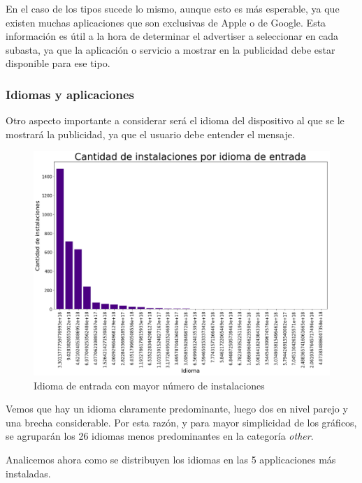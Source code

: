 \documentclass[a4paper, 12pt]{article}
\begin{document}
		En el caso de los tipos sucede lo mismo, aunque esto es más esperable, ya que existen muchas aplicaciones que son exclusivas de Apple o de Google. Esta información es útil a la hora de determinar el advertiser a seleccionar en cada subasta, ya que la aplicación o servicio a mostrar en la publicidad debe estar disponible para ese tipo.

	\subsubsection{Idiomas y aplicaciones}
		Otro aspecto importante a considerar será el idioma del dispositivo al que se le mostrará la publicidad, ya que el usuario debe entender el mensaje.

		\FloatBarrier
		\begin{figure}[h]
			\centering
			\includegraphics[width=\textwidth]{images/installs/idiomas.png}
			\caption{Idioma de entrada con mayor número de instalaciones}
		\end{figure}
		\FloatBarrier

		Vemos que hay un idioma claramente predominante, luego dos en nivel parejo y una brecha considerable.
		Por esta razón, y para mayor simplicidad de los gráficos, se agruparán los 26 idiomas menos predominantes en la categoría \textit{other}.

		Analicemos ahora como se distribuyen los idiomas en las 5 applicaciones más instaladas.
\end{document}
